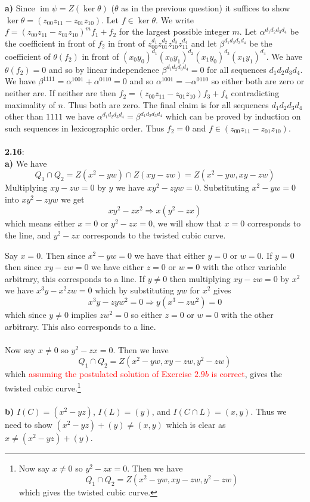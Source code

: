 \documentclass[12pt]{article}
\numberwithin{thm}{subsection}
\numberwithin{defn}{subsection}
\numberwithin{lemma}{subsection}
\numberwithin{example}{subsection}
\numberwithin{notation}{subsection}
\numberwithin{cor}{subsection}
\numberwithin{remark}{subsection}
\numberwithin{condition}{subsection}
\numberwithin{question}{subsection}
\numberwithin{construction}{subsection}
\numberwithin{construction}{subsection}
\numberwithin{construction}{subsection}
\newcommand{\im}{\operatorname{im}}
\begin{document}
\textbf{a)} Since $\im \psi = Z(\ker \theta)$ ($\theta$ as in the previous question) it suffices to show $\ker \theta = (z_{00}z_{11} - z_{01}z_{10})$. Let $f \in \ker \theta$. We write $f = (z_{00}z_{11} - z_{01}z_{10})^mf_1 + f_2$ for the largest possible integer $m$. Let $\alpha^{d_1d_2d_3d_4}$ be the coefficient in front of $f_2$ in front of $z_{00}^{d_1}z_{01}^{d_2}z_{10}^{d_3}z_{11}^{d_4}$ and let $\beta^{d_1d_2d_3d_4}$ be the coefficient of $\theta(f_2)$ in front of $(x_0y_0)^{d_1}(x_0y_1)^{d_2}(x_1y_0)^{d_3}(x_1y_1)^{d_4}$. We have $\theta(f_2) = 0$ and so by linear independence $\beta^{d_1d_2d_3d_4} = 0$ for all sequences $d_1d_2d_3d_4$. We have $\beta^{1111} = \alpha^{1001} + \alpha^{0110} = 0$ and so $\alpha^{1001} = -\alpha^{0110}$ so either both are zero or neither are. If neither are then $f_2 = (z_{00}z_{11} - z_{01}z_{10})f_3 + f_4$ contradicting maximality of $n$. Thus both are zero. The final claim is for all sequences $d_1d_2d_3d_4$ other than $1111$ we have $\alpha^{d_1d_2d_3d_4} = \beta^{d_1d_2d_3d_4}$ which can be proved by induction on such sequences in lexicographic order. Thus $f_2 = 0$ and $f \in (z_{00}z_{11} - z_{01}z_{10})$.\\\\
%
\textbf{2.16}:\\
%
\textbf{a)} We have
\[Q_1 \cap Q_2 = Z(x^2 - yw) \cap Z(xy -zw) = Z(x^2 - yw, xy - zw)\]
Multiplying $xy - zw = 0$ by $y$ we have $xy^2 - zyw = 0$. Substituting $x^2 - yw = 0$ into $xy^2 - zyw$ we get
\[xy^2 - zx^2 \Longrightarrow x(y^2 - zx)\]
which means either $x = 0$ or $y^2 - zx = 0$, we will show that $x = 0$ corresponds to the line, and $y^2 - zx$ corresponds to the twisted cubic curve.

Say $x = 0$. Then since $x^2 - yw = 0$ we have that either $y = 0$ or $w = 0$. If $y = 0$ then since $xy - zw = 0$ we have either $z = 0$ or $w = 0$ with the other variable arbitrary, this corresponds to a line. If $y \neq 0$ then multiplying $xy - zw = 0$ by $x^2$ we have $x^3y - x^2zw = 0$ which by substituting $yw$ for $x^2$ gives
\[x^3y - zyw^2 = 0 \Longrightarrow y(x^3 - zw^2) = 0\]
which since $y \neq 0$ implies $zw^2 = 0$ so either $z = 0$ or $w = 0$ with the other arbitrary. This also corresponds to a line.\\\\
%
Now say $x \neq 0$ so $y^2 - zx = 0$. Then we have
\[Q_1 \cap Q_2 = Z(x^2 - yw, xy - zw, y^2 - zw)\]
which \textcolor{red}{assuming the postulated solution of Exercise $2.9b$ is correct}, gives the twisted cubic curve.\footnote{Now say $x \neq 0$ so $y^2 - zx = 0$. Then we have
\[Q_1 \cap Q_2 = Z(x^2 - yw, xy -zw, y^2 - zw)\]
which gives the twisted cubic curve.}\\\\
%
\textbf{b)} $I(C) = (x^2 - yz)$, $I(L) = (y)$, and $I(C \cap L) = (x,y)$. Thus we need to show $(x^2 - yz) + (y) \neq (x,y)$ which is clear as $x \neq (x^2 - yz) + (y)$.
\end{document}
